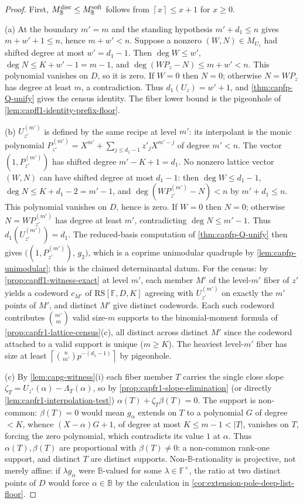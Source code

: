 \documentclass[11pt]{article}
\theoremstyle{definition}
\theoremstyle{remark}
\newcommand{\F}{\mathbb{F}}
\newcommand{\B}{\mathbb{B}}
\newcommand{\RS}{\mathrm{RS}}
\providecommand{\ceil}[1]{\left\lceil #1\right\rceil}
\begin{document}
\begin{proof}
First, $M_{\B}^{\rm disc}\le M_{\B}^{\rm soft}$ follows from
$\ceil{x}\le x+1$ for $x\ge0$.

\textup{(a)}  At the boundary $m'=m$ and the standing hypothesis
$m'+d_1\le n$ gives $m+w'+1\le n$, hence $m+w'<n$.  Suppose a nonzero
$(W,N)\in M_{U_z}$ had shifted degree at most $w'=d_1-1$.  Then
$\deg W\le w'$, $\deg N\le K+w'-1=m-1$, and
$\deg(WP_z-N)\le m+w'<n$.  This polynomial vanishes on $D$, so it is zero.
If $W=0$ then $N=0$; otherwise $N=WP_z$ has degree at least $m$, a
contradiction.  Thus $d_1(U_z)=w'+1$, and
\cref{thm:capfp-Q-unify} gives the census identity.  The fiber lower bound is
the pigeonhole of \cref{lem:capff1-identity-prefix-floor}.

\textup{(b)}  $U^{(m')}_{z'}$ is defined by the same recipe at level
$m'$: its interpolant is the monic polynomial
$P^{(m')}_{z'}=X^{m'}+\sum_{j\le d_1-1}z'_jX^{m'-j}$ of degree $m'<n$.
The vector $(1,P^{(m')}_{z'})$ has shifted degree $m'-K+1=d_1$.  No nonzero lattice vector $(W,N)$ can have shifted degree at most $d_1-1$: then $\deg W\le d_1-1$, $\deg N\le K+d_1-2=m'-1$, and $\deg(WP^{(m')}_{z'}-N)<n$ by $m'+d_1\le n$.  This polynomial vanishes on $D$, hence is zero.  If $W=0$ then $N=0$; otherwise $N=WP^{(m')}_{z'}$ has degree at least $m'$, contradicting $\deg N\le m'-1$.  Thus $d_1(U^{(m')}_{z'})=d_1$.  The reduced-basis computation of \cref{thm:capfp-Q-unify} then gives
$\bigl((1,P^{(m')}_{z'}),\,g_2\bigr)$, which is a coprime unimodular
quadruple by \cref{lem:capfp-unimodular}; this is the claimed
determinantal datum.  For the census: by
\cref{prop:capff1-witness-exact} at level $m'$, each member $M'$ of the
level-$m'$ fiber of $z'$ yields a codeword $c_{M'}$ of $\RS[\F,D,K]$
agreeing with $U^{(m')}_{z'}$ on exactly the $m'$ points of $M'$, and
distinct $M'$ give distinct codewords.  Each such codeword contributes
$\binom{m'}m$ valid size-$m$ supports to the binomial-moment formula of
\cref{prop:capfr1-lattice-census}\textup{(c)}, all distinct across
distinct $M'$ since the codeword attached to a valid support is unique
($m\ge K$).  The heaviest level-$m'$ fiber has size at least
$\ceil{\binom n{m'}p^{-(d_1-1)}}$ by pigeonhole.

\textup{(c)}  By \cref{lem:capg-witness}\textup{(i)} each fiber member
$T$ carries the single close slope
$\zeta_T=U_{z^{*}}(\alpha)-\Lambda_T(\alpha)$, so by
\cref{prop:capfr1-slope-elimination} (or directly
\cref{lem:capfr1-interpolation-test}) $\alpha(T)+\zeta_T\beta(T)=0$.  The
support is non-common: $\beta(T)=0$ would mean $g_\alpha$ extends on $T$
to a polynomial $G$ of degree $<K$, whence $(X-\alpha)G+1$, of degree at
most $K\le m-1<|T|$, vanishes on $T$, forcing the zero polynomial, which
contradicts its value $1$ at $\alpha$.  Thus $\alpha(T),\beta(T)$ are
proportional with $\beta(T)\ne0$: a non-common rank-one support, and
distinct $T$ are distinct supports.  Non-$\B$-rationality is projective, not merely affine: if
$\lambda g_\alpha$ were $\B$-valued for some $\lambda\in\F^\times$, the ratio
at two distinct points of $D$ would force $\alpha\in\B$ by the calculation in
\cref{cor:extension-pole-deep-list-floor}.


\end{proof}
\end{document}
